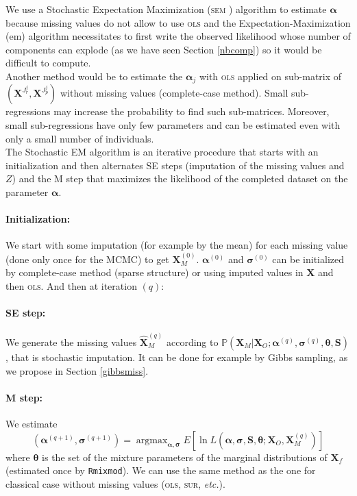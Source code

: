\documentclass[12pt,a4paper]{report}
\begin{document}
	We use a Stochastic Expectation Maximization (\textsc{sem} \cite{celeux1986algorithme}) algorithm  to estimate $\boldsymbol{\alpha}$ because missing values do not allow to use \textsc{ols} and  the Expectation-Maximization ({\sc em}) algorithm necessitates to first write the observed likelihood whose number of components can explode (as we have seen Section \ref{nbcomp}) so it would be difficult to compute.\\
	
	Another method would be to estimate the $\boldsymbol{\alpha}_j$ with \textsc{ols} applied on sub-matrix of $(\boldsymbol{X}^{J_r^j},\boldsymbol{X}^{J_p^j})$ without missing values (complete-case method). Small sub-regressions may increase the probability to find such sub-matrices. Moreover, small sub-regressions have only few parameters and can be estimated even with only a small number of individuals.\\
		
	The Stochastic EM algorithm is an iterative procedure that starts with an initialization and then alternates SE steps (imputation of the missing values and $Z$) and the M step that maximizes the likelihood of the completed dataset on the parameter $\boldsymbol{\alpha}$.
	
	\paragraph{Initialization:} We start with some imputation (for example by the mean) for each missing value (done only once for the MCMC) to get $\boldsymbol{X}_M^{(0)}$. $\boldsymbol{\alpha}^{(0)}$ and $\boldsymbol{\sigma}^{(0)}$ can be initialized by complete-case method	(sparse structure) or using imputed values in $\boldsymbol{X}$ and then \textsc{ols}. 
	And then at iteration $(q)$:
	\paragraph{SE step:}
		We generate the missing values $\hat{\boldsymbol{X}}_M^{(q)}$ according to $\mathbb{P}(\boldsymbol{X}_M|\boldsymbol{X}_O; \boldsymbol{\alpha}^{(q)},\boldsymbol{\sigma}^{(q)},\boldsymbol{\theta},\boldsymbol{S})$, that is stochastic imputation. It can be done for example by Gibbs sampling, as we propose in Section \ref{gibbsmiss}.
	\paragraph{M step:}
		We estimate 
		\begin{equation}
	(\boldsymbol{\alpha}^{(q+1)},\boldsymbol{\sigma}^{(q+1)})=\operatorname{argmax}_{\boldsymbol{\alpha},\boldsymbol{\sigma}}E\left[\ln L(\boldsymbol{\alpha},\boldsymbol{\sigma},\boldsymbol{S},\boldsymbol{\theta};\boldsymbol{X}_O,\boldsymbol{X}_M^{(q)}) \right]  \nonumber 
\end{equation}
where $\boldsymbol{\theta}$ is the set of the mixture parameters of the marginal distributions of $\boldsymbol{X}_f$ (estimated once by {\tt Rmixmod}). We can use the same method as the one for classical case without missing values (\textsc{ols}, \textsc{sur}, {\it etc.}). %
\end{document}
